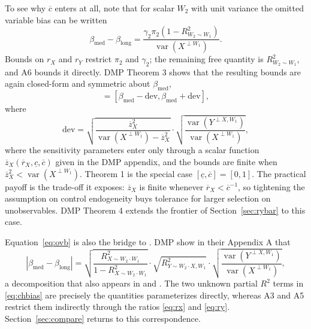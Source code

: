 \documentclass[article]{jss}\usepackage[]{graphicx}\usepackage[]{xcolor}
\newcommand{\blong}{\beta_{\mathrm{long}}}
\newcommand{\bmed}{\beta_{\mathrm{med}}}
\newcommand{\rxbar}{\ensuremath{\overline{r}_X}}
\newcommand{\cbar}{\ensuremath{\overline{c}}}
\newcommand{\clow}{\ensuremath{\underline{c}}}
\newcommand{\Rsq}[1]{\ensuremath{R^2_{#1}}}
\newcommand{\Var}{\operatorname{var}}
\begin{document}
To see why $\cbar$ enters at all, note that for scalar $W_2$ with unit
variance the omitted variable bias can be written
\begin{equation}
\bmed - \blong
= \frac{\gamma_2 \pi_2 \left(1 - \Rsq{W_2 \sim W_1}\right)}
       {\Var(X^{\perp W_1})}.
\label{eq:ovb}
\end{equation}
Bounds on $r_X$ and $r_Y$ restrict $\pi_2$ and $\gamma_2$; the remaining
free quantity is $\Rsq{W_2 \sim W_1}$, and A6 bounds it directly. DMP
Theorem 3 shows that the resulting bounds are again closed-form and
symmetric about $\bmed$,
\begin{equation}
[\underline{B}(\rxbar, \clow, \cbar), \overline{B}(\rxbar, \clow, \cbar)]
= \left[\bmed - \mathrm{dev}, \bmed + \mathrm{dev}\right],
\label{eq:thm3}
\end{equation}
where
\begin{equation}
\mathrm{dev} = \sqrt{\frac{\overline{z}_X^2}
                          {\Var(X^{\perp W_1}) - \overline{z}_X^2}}
               \cdot
               \sqrt{\frac{\Var(Y^{\perp X, W_1})}{\Var(X^{\perp W_1})}},
\label{eq:thm3dev}
\end{equation}
where the sensitivity parameters enter only through a scalar function
$\overline{z}_X(\rxbar, \clow, \cbar)$ given in the DMP appendix, and the
bounds are finite when $\overline{z}_X^2 < \Var(X^{\perp W_1})$. Theorem 1
is the special case $[\clow, \cbar] = [0, 1]$. The practical payoff is the
trade-off it exposes: $\overline{z}_X$ is finite whenever
$\rxbar < \cbar^{-1}$, so tightening the assumption on control endogeneity
buys tolerance for larger selection on unobservables. DMP Theorem 4
extends the frontier of Section~\ref{sec:rybar} to this case.

Equation~\eqref{eq:ovb} is also the bridge to \citet{Cinelli2020}. DMP
show in their Appendix A that
\begin{equation}
|\bmed - \blong|
= \sqrt{\frac{\Rsq{X \sim W_2 \cdot W_1}}{1 - \Rsq{X \sim W_2 \cdot W_1}}}
  \cdot \sqrt{\Rsq{Y \sim W_2 \cdot X, W_1}}
  \cdot \sqrt{\frac{\Var(Y^{\perp X, W_1})}{\Var(X^{\perp W_1})}},
\label{eq:chbias}
\end{equation}
a decomposition that also appears in \citet{Hosman2010} and
\citet{Cinelli2020}. The two unknown partial $R^2$ terms in
\eqref{eq:chbias} are precisely the quantities 
parameterizes directly, whereas A3 and A5 restrict them indirectly through
the ratios \eqref{eq:rx} and \eqref{eq:ry}. Section~\ref{sec:compare}
returns to this correspondence.
\end{document}
